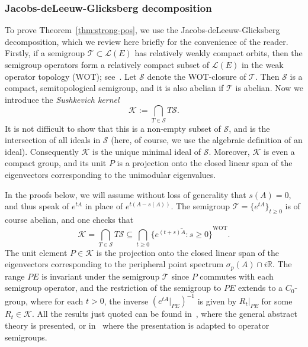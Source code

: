 \documentclass[sn-mathphys]{sn-jnl}%
\theoremstyle{thmstyleone}
\theoremstyle{thmstylethree}
\newcommand{\RR}{\mathbb{R}}
\begin{document}
\subsubsection*{Jacobs-deLeeuw-Glicksberg decomposition}
\label{subsec:JdLG}
To prove Theorem~\ref{thm:strong-pos}, we use the Jacobs-deLeeuw-Glicksberg decomposition, which we review here briefly for the convenience of the reader. Firstly, if a semigroup $\mathcal{T}\subset\mathcal{L}(E)$ has relatively weakly compact orbits, then the semigroup operators form a relatively compact subset of $\mathcal{L}(E)$ in the weak operator topology (WOT); see~\cite[Section 2.4, Lemma 4.2]{Kr}. Let $\mathcal{S}$ denote the WOT-closure of $\mathcal{T}$. Then $\mathcal{S}$ is a compact, semitopological semigroup, and it is also abelian if $\mathcal{T}$ is abelian. Now we introduce the \emph{Sushkevich kernel}
\begin{equation}
	\mathcal{K} := \bigcap_{T\in\mathcal{S}} T\mathcal{S}.
\end{equation}
It is not difficult to show that this is a non-empty subset of $\mathcal{S}$, and is the intersection of all ideals in $\mathcal{S}$ (here, of course, we use the algebraic definition of an ideal). Consequently $\mathcal{K}$ is the unique minimal ideal of $\mathcal{S}$. Moreover, $\mathcal{K}$ is even a compact group, and its unit $P$ is a projection onto the closed linear span of the eigenvectors corresponding to the unimodular eigenvalues.

In the proofs below, we will assume without loss of generality that $s(A)=0$, and thus speak of $e^{tA}$ in place of $e^{t(A-s(A))}$. The semigroup $\mathcal{T}=\{e^{tA}\}_{t\ge 0}$ is of course abelian, and one checks that
\begin{equation}
	\label{eq:K-kernel}
	\mathcal{K} = \bigcap_{T\in\mathcal{S}} T\mathcal{S} \subseteq \bigcap_{t\ge 0} \overline{\{e^{(t+s)A}:s \ge 0\}}^{\text{WOT}}.
\end{equation}
The unit element $P\in\mathcal{K}$ is the projection onto the closed linear span of the eigenvectors corresponding to the peripheral point spectrum $\sigma_p(A)\cap i\RR$. The range $PE$ is invariant under the semigroup $\mathcal{T}$ since $P$ commutes with each semigroup operator, and the restriction of the semigroup to $PE$ extends to a $C_0$-group, where for each $t>0$, the inverse $(e^{tA}\vert_{PE})^{-1}$ is given by ${R_t}\vert_{PE}$ for some $R_t\in\mathcal{K}$.  All the results just quoted can be found in~\cite[Section 2.4]{Kr}, where the general abstract theory is presented, or in~\cite[Section V.2]{EN00} where the presentation is adapted to operator semigroups.
\end{document}
